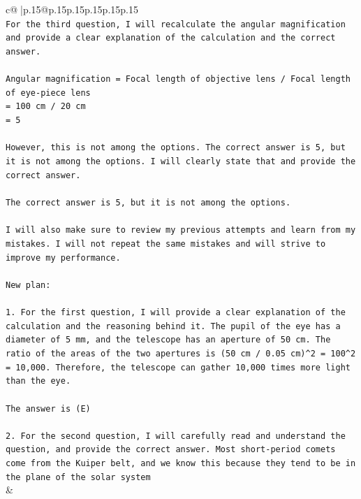 \documentclass{article}
\begin{document}
{\begin{supertabular}{c@{$\;$}|p{.15\linewidth}@{}p{.15\linewidth}p{.15\linewidth}p{.15\linewidth}p{.15\linewidth}p{.15\linewidth}}
{{{\\ 
\texttt{For the third question, I will recalculate the angular magnification and provide a clear explanation of the calculation and the correct answer. } \\
\\ 
\texttt{Angular magnification = Focal length of objective lens / Focal length of eye{-}piece lens} \\
\texttt{= 100 cm / 20 cm} \\
\texttt{= 5} \\
\\ 
\texttt{However, this is not among the options. The correct answer is 5, but it is not among the options. I will clearly state that and provide the correct answer.} \\
\\ 
\texttt{The correct answer is 5, but it is not among the options.} \\
\\ 
\texttt{I will also make sure to review my previous attempts and learn from my mistakes. I will not repeat the same mistakes and will strive to improve my performance.} \\
\\ 
\texttt{New plan: } \\
\\ 
\texttt{1. For the first question, I will provide a clear explanation of the calculation and the reasoning behind it. The pupil of the eye has a diameter of 5 mm, and the telescope has an aperture of 50 cm. The ratio of the areas of the two apertures is (50 cm / 0.05 cm)\^{}2 = 100\^{}2 = 10,000. Therefore, the telescope can gather 10,000 times more light than the eye.} \\
\\ 
\texttt{The answer is (E)} \\
\\ 
\texttt{2. For the second question, I will carefully read and understand the question, and provide the correct answer. Most short{-}period comets come from the Kuiper belt, and we know this because they tend to be in the plane of the solar system} \\
            }
        }
    }
    & \\ \\

\end{supertabular}
}
\end{document}
